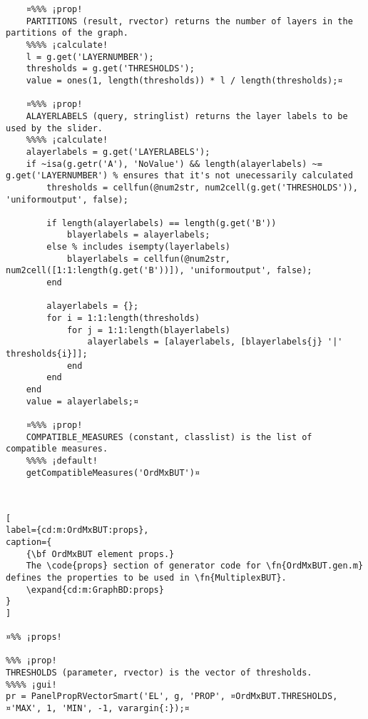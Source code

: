\documentclass{tufte-handout}
\begin{document}
\begin{lstlisting}
	¤%%% ¡prop!
	PARTITIONS (result, rvector) returns the number of layers in the partitions of the graph.
	%%%% ¡calculate!
	l = g.get('LAYERNUMBER');
	thresholds = g.get('THRESHOLDS');
	value = ones(1, length(thresholds)) * l / length(thresholds);¤
	
	¤%%% ¡prop!
	ALAYERLABELS (query, stringlist) returns the layer labels to be used by the slider.
	%%%% ¡calculate!
	alayerlabels = g.get('LAYERLABELS');
	if ~isa(g.getr('A'), 'NoValue') && length(alayerlabels) ~= g.get('LAYERNUMBER') % ensures that it's not unecessarily calculated
		thresholds = cellfun(@num2str, num2cell(g.get('THRESHOLDS')), 'uniformoutput', false);
	
		if length(alayerlabels) == length(g.get('B'))
			blayerlabels = alayerlabels;
		else % includes isempty(layerlabels)
			blayerlabels = cellfun(@num2str, num2cell([1:1:length(g.get('B'))]), 'uniformoutput', false);
		end
		
		alayerlabels = {};
		for i = 1:1:length(thresholds)
			for j = 1:1:length(blayerlabels)
				alayerlabels = [alayerlabels, [blayerlabels{j} '|' thresholds{i}]];
			end
		end
	end
	value = alayerlabels;¤
	
	¤%%% ¡prop!
	COMPATIBLE_MEASURES (constant, classlist) is the list of compatible measures.
	%%%% ¡default!
	getCompatibleMeasures('OrdMxBUT')¤
	
	
\end{lstlisting}



\begin{lstlisting}[
label={cd:m:OrdMxBUT:props},
caption={
	{\bf OrdMxBUT element props.}
	The \code{props} section of generator code for \fn{OrdMxBUT.gen.m} defines the properties to be used in \fn{MultiplexBUT}.
	\expand{cd:m:GraphBD:props}
}
]

¤%% ¡props!

%%% ¡prop!
THRESHOLDS (parameter, rvector) is the vector of thresholds.
%%%% ¡gui!
pr = PanelPropRVectorSmart('EL', g, 'PROP', ¤OrdMxBUT.THRESHOLDS, ¤'MAX', 1, 'MIN', -1, varargin{:});¤
	
\end{lstlisting}
\end{document}
